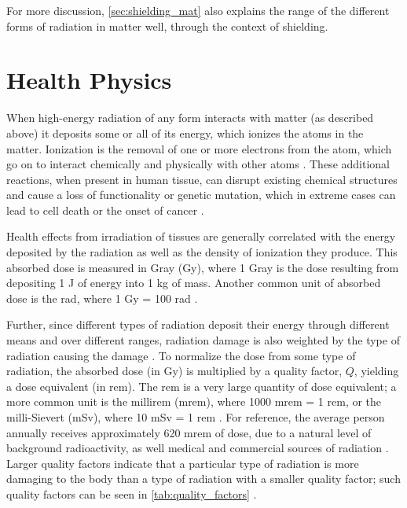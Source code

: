 \documentclass{report}
\begin{document}
 
 For more discussion, \autoref{sec:shielding_mat} also explains the range of the different forms of radiation in matter well, through the context of shielding.




\section{Health Physics}

When high-energy radiation of any form interacts with matter (as described above) it deposits some or all of its energy, which ionizes the atoms in the matter. Ionization is the removal of one or more electrons from the atom, which go on to interact chemically and physically with other atoms \cite{krane1987introductory}. These additional reactions, when present in human tissue, can disrupt existing chemical structures and cause a loss of functionality or genetic mutation, which in extreme cases can lead to cell death or the onset of cancer \cite{Stabin2007}. 

Health effects from irradiation of tissues are generally correlated with the energy deposited by the radiation as well as the density of ionization they produce. This absorbed dose is measured in Gray (Gy), where 1 Gray is the dose resulting from depositing 1 J of energy into 1 kg of mass. Another common unit of absorbed dose is the rad, where 1 Gy = 100 rad \cite{Stabin2007}.


Further, since different types of radiation deposit their energy through different means and over different ranges, radiation damage is also weighted by the type of radiation causing the damage \cite{Cherry2012}. To normalize the dose from some type of radiation, the absorbed dose (in Gy) is multiplied by a quality factor, \(Q\), yielding a dose equivalent (in rem). The rem is a very large quantity of dose equivalent; a more common unit is the millirem (mrem), where 1000 mrem = 1 rem, or the milli-Sievert (mSv), where 10 mSv = 1 rem \cite{Cember2008}. For reference, the average person annually receives approximately 620 mrem of dose, due to a natural level of background radioactivity, as well medical and commercial sources of radiation \cite{U.S.NuclearRegulatoryCommission2014}. Larger quality factors indicate that a particular type of radiation is more damaging to the body than a type of radiation with a smaller quality factor; such quality factors can be seen in \autoref{tab:quality_factors} \cite{Cember2008}.
\end{document}
